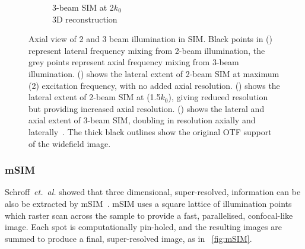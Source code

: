 \begin{figure}
\begin{subfigure}[t]{0.48\textwidth}
        \caption{3-beam SIM at \SI{2}{\times}\(k_0\)\\
        3D reconstruction}\label{fig:sim_axial_3_beam}
    \end{subfigure}\hfill
    \caption[Axial view of 2 and 3 beam illumination in \gls{SIM}]{
    Axial view of 2 and 3 beam illumination in \gls{SIM}.
    Black points in () represent lateral frequency mixing from 2-beam illumination, the grey points represent axial frequency mixing from 3-beam illumination.
    () shows the lateral extent of 2-beam \gls{SIM} at maximum (\SI{2}{\times}) excitation frequency, with no added axial resolution.
    () shows the lateral extent of 2-beam \gls{SIM} at (\SI{1.5}{\times}\(k_0\)), giving reduced resolution but providing increased axial resolution.
     () shows the lateral and axial extent of 3-beam \gls{SIM}, doubling in resolution axially and laterally~\cite{gustafssonSurpassingLateralResolution2000}.
     The thick black outlines show the original OTF support of the widefield image.
    }\label{fig:sim_axial}
\end{figure}

\subsubsection{\gls{mSIM}}\label{sec:msim}

Schroff~\emph{et.~al.} showed that three dimensional, super-resolved, information can be also be extracted by \gls{mSIM}~\cite{yorkResolutionDoublingLive2012}.
\gls{mSIM} uses a square lattice of illumination points which raster scan across the sample to provide a fast, parallelised, confocal-like image.
Each spot is computationally pin-holed, and the resulting images are summed to produce a final, super-resolved image, as in \figurename~\ref{fig:mSIM}.

